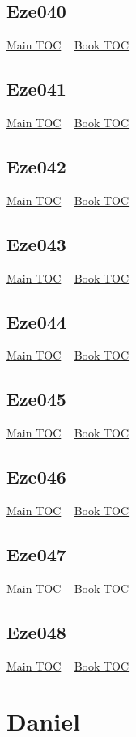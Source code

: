 \documentclass{book}
\begin{document}
  \section{Eze040}\hyperlink{toc}{Main TOC} ~ \hyperref[subsec:Eze]{Book TOC} 
  \section{Eze041}\hyperlink{toc}{Main TOC} ~ \hyperref[subsec:Eze]{Book TOC} 
  \section{Eze042}\hyperlink{toc}{Main TOC} ~ \hyperref[subsec:Eze]{Book TOC} 
  \section{Eze043}\hyperlink{toc}{Main TOC} ~ \hyperref[subsec:Eze]{Book TOC} 
  \section{Eze044}\hyperlink{toc}{Main TOC} ~ \hyperref[subsec:Eze]{Book TOC} 
  \section{Eze045}\hyperlink{toc}{Main TOC} ~ \hyperref[subsec:Eze]{Book TOC} 
  \section{Eze046}\hyperlink{toc}{Main TOC} ~ \hyperref[subsec:Eze]{Book TOC} 
  \section{Eze047}\hyperlink{toc}{Main TOC} ~ \hyperref[subsec:Eze]{Book TOC} 
  \section{Eze048}\hyperlink{toc}{Main TOC} ~ \hyperref[subsec:Eze]{Book TOC} 
  \chapter{Daniel} \label{subsec:Dan} \begin{multicols}{2} \minitoc \end{multicols}
\end{document}
